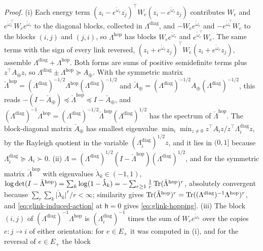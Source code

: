 \noindent\emph{Proof.}
(i) Each energy term \((z_i-e^{\mathring\omega_e}z_j)^\top W_e(z_i-e^{\mathring\omega_e}z_j)\) contributes
\(W_e\) and \(e^{\mathring\omega_e^\top}W_ee^{\mathring\omega_e}\) to the diagonal blocks, collected in
\(\Lambda^{\mathrm{diag}}\), and \(-W_ee^{\mathring\omega_e}\) and \(-e^{\mathring\omega_e^\top}W_e\) to the blocks
\((i,j)\) and \((j,i)\), so \(\Lambda^{\mathrm{hop}}\) has blocks \(W_ee^{\mathring\omega_e}\) and
\(e^{\mathring\omega_e^\top}W_e\). The same terms with the sign of every link reversed,
\((z_i+e^{\mathring\omega_e}z_j)^\top W_e(z_i+e^{\mathring\omega_e}z_j)\), assemble
\(\Lambda^{\mathrm{diag}}+\Lambda^{\mathrm{hop}}\). Both forms are sums of positive semidefinite terms plus
\(z^\top A_\oplus z\), so \(\Lambda^{\mathrm{diag}}\pm\Lambda^{\mathrm{hop}}\succeq A_\oplus\). With the symmetric
matrix \(\breve\Lambda^{\mathrm{hop}}=(\Lambda^{\mathrm{diag}})^{-1/2}\Lambda^{\mathrm{hop}}(\Lambda^{\mathrm{diag}})^{-1/2}\)
and \(\breve A_\oplus=(\Lambda^{\mathrm{diag}})^{-1/2}A_\oplus(\Lambda^{\mathrm{diag}})^{-1/2}\), this reads
\(-(I-\breve A_\oplus)\preceq\breve\Lambda^{\mathrm{hop}}\preceq I-\breve A_\oplus\), and
\((\Lambda^{\mathrm{diag}})^{-1}\Lambda^{\mathrm{hop}}=(\Lambda^{\mathrm{diag}})^{-1/2}\breve\Lambda^{\mathrm{hop}}(\Lambda^{\mathrm{diag}})^{1/2}\)
has the spectrum of \(\breve\Lambda^{\mathrm{hop}}\). The block-diagonal matrix \(\breve A_\oplus\) has smallest
eigenvalue \(\min_i\min_{z\neq0}z^\top A_iz/z^\top\Lambda^{\mathrm{diag}}_iz\), by the Rayleigh quotient in the
variable \((\Lambda^{\mathrm{diag}}_i)^{1/2}z\), and it lies in \((0,1]\) because
\(\Lambda^{\mathrm{diag}}_i\succeq A_i\succ0\).
(ii) \(\Lambda=(\Lambda^{\mathrm{diag}})^{1/2}(I-\breve\Lambda^{\mathrm{hop}})(\Lambda^{\mathrm{diag}})^{1/2}\), and for
the symmetric matrix \(\breve\Lambda^{\mathrm{hop}}\) with eigenvalues \(\mathring\lambda_k\in(-1,1)\),
\(\log\det(I-\breve\Lambda^{\mathrm{hop}})=\sum_k\log(1-\mathring\lambda_k)=-\sum_{r\geq1}\frac1r\operatorname{Tr}(\breve\Lambda^{\mathrm{hop}})^r\),
absolutely convergent because \(\sum_r\sum_k\lvert\mathring\lambda_k\rvert^r/r<\infty\); similarity gives
\(\operatorname{Tr}(\breve\Lambda^{\mathrm{hop}})^r=\operatorname{Tr}((\Lambda^{\mathrm{diag}})^{-1}\Lambda^{\mathrm{hop}})^r\), and
\eqref{eq:glink-induced-action} at \(\mathsf h=0\) gives \eqref{eq:glink-hopping}.
(iii) The block \((i,j)\) of \((\Lambda^{\mathrm{diag}})^{-1}\Lambda^{\mathrm{hop}}\) is
\((\Lambda^{\mathrm{diag}}_i)^{-1}\) times the sum of \(W_ee^{\mathring\omega_e}\) over the copies \(e:j\to i\) of
either orientation: for \(e\in E_+\) it was computed in (i), and for the reversal of \(e\in E_+\) the block
